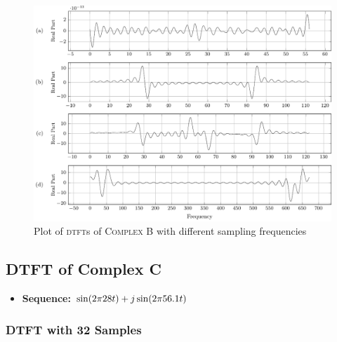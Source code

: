 \documentclass[../../course]{subfiles}
\begin{document}
\vfill

\begin{figure} [H]
    \centering
     {
        \includegraphics[height = 0.8\textheight] {tikzpics/plotDtftComplexB64.pdf}
    }
     {Plot of \textsc{dtft}s of \textsc{Complex B} with different sampling frequencies}
    \label{plt:dtftCplxB64}
\end{figure}

\pagebreak

\subsection{DTFT of Complex C} \label{ssec:dtftCplxC}

\begin{itemize} [label=]

    \item \textbf{Sequence:} $\sin(2 \pi 28 t) + j \sin(2 \pi 56.1 t)$

\end{itemize}

\subsubsection{DTFT with 32 Samples}
\end{document}
